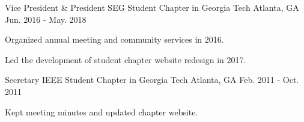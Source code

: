 

\begin{cventries}

  \cventry
    {Vice President \& President} %
    {SEG Student Chapter in Georgia Tech} %
    {Atlanta, GA} %
    {Jun. 2016 - May. 2018} %
    {
      \begin{cvitems} %
        \item {Organized annual meeting and community services in 2016.}
        \item {Led the development of student chapter website redesign in 2017.}
      \end{cvitems}
    }

  \cventry
    {Secretary} %
    {IEEE Student Chapter in Georgia Tech} %
    {Atlanta, GA} %
    {Feb. 2011 - Oct. 2011} %
    {
      \begin{cvitems} %
        \item {Kept meeting minutes and updated chapter website.}
      \end{cvitems}
    }
\end{cventries}

